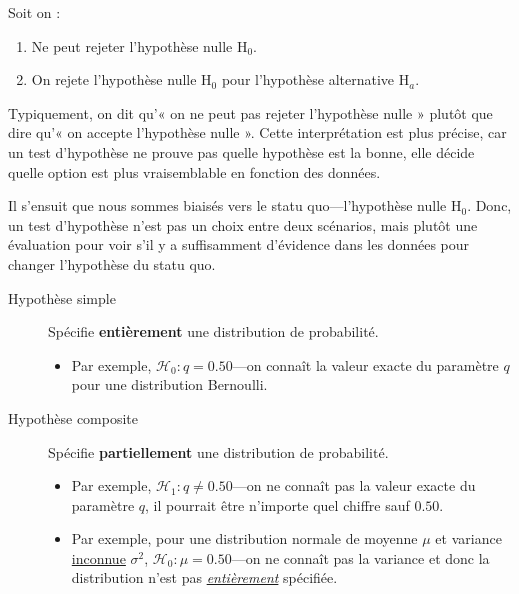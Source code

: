 \documentclass[french]{article}
\begin{document}
\begin{multicols*}{2}
\begin{definitionNOHFILL}
\begin{definitionNOHFILLprop}
Soit on : 
\begin{enumerate}[label = \circled{\arabic*}{trueblue}]
	\item	Ne peut rejeter l'hypothèse nulle $\textrm{H}_{0}$.
	\item	On rejete l'hypothèse nulle $\mathrm{H}_{0}$ pour l'hypothèse alternative $\mathrm{H}_{a}$.
\end{enumerate}
\end{definitionNOHFILLprop}
\end{definitionNOHFILL}

\begin{rappel_enhanced}[Contexte]
Typiquement, on dit qu’« on ne peut pas rejeter l'hypothèse nulle » plutôt que dire qu’« on accepte l'hypothèse nulle ». Cette interprétation est plus précise, car un test d'hypothèse ne prouve pas quelle hypothèse est la bonne, elle décide quelle option est plus vraisemblable en fonction des données. 

\bigskip

Il s'ensuit que nous sommes biaisés vers le statu quo---l'hypothèse nulle $\mathrm{H}_{0}$. Donc, un test d'hypothèse n'est pas un choix entre deux scénarios, mais plutôt une évaluation pour voir s'il y a suffisamment d'évidence dans les données pour changer l'hypothèse du statu quo.
\end{rappel_enhanced}


\begin{distributions}[Terminologie]
\begin{description}
\item[\hypertarget{hyp-simple}{Hypothèse simple}]	Spécifie \textbf{entièrement} une distribution de probabilité.
	\begin{itemize}
	\item	Par exemple, $\mathcal{H}_{0}	:	q = 0.50$---on connaît la valeur exacte du paramètre $q$ pour une distribution Bernoulli.
	\end{itemize}
\item[Hypothèse composite]	Spécifie \textbf{partiellement} une distribution de probabilité.
	\begin{itemize}
	\item	Par exemple, $\mathcal{H}_{1}	:	q \neq 0.50$---on ne connaît pas la valeur exacte du paramètre $q$, il pourrait être n'importe quel chiffre sauf $0.50$.
	\item	Par exemple, pour une distribution normale de moyenne $\mu$ et variance \underline{inconnue} $\sigma^{2}$, $\mathcal{H}_{0}	:	\mu = 0.50$---on ne connaît pas la variance et donc la distribution n'est pas \textit{\underline{entièrement}} spécifiée.
	\end{itemize}
\end{description}
\end{distributions}


\end{multicols*}
\end{document}
